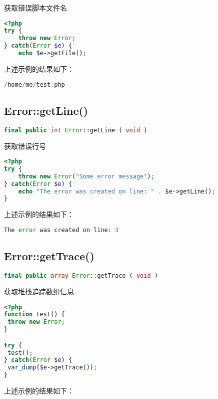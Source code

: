 获取错误脚本文件名




\begin{lstlisting}[language=PHP]
<?php
try {
    throw new Error;
} catch(Error $e) {
    echo $e->getFile();
\end{lstlisting}

上述示例的结果如下：

\begin{lstlisting}[language=PHP]
/home/me/test.php
\end{lstlisting}


\subsection{Error::getLine()}

\begin{lstlisting}[language=PHP]
final public int Error::getLine ( void )
\end{lstlisting}

获取错误行号



\begin{lstlisting}[language=PHP]
<?php
try {
    throw new Error("Some error message");
} catch(Error $e) {
    echo "The error was created on line: " . $e->getLine();
}
\end{lstlisting}

上述示例的结果如下：

\begin{lstlisting}[language=PHP]
The error was created on line: 3
\end{lstlisting}


\subsection{Error::getTrace()}

\begin{lstlisting}[language=PHP]
final public array Error::getTrace ( void )
\end{lstlisting}

获取堆栈追踪数组信息



\begin{lstlisting}[language=PHP]
<?php
function test() {
 throw new Error;
}

try {
 test();
} catch(Error $e) {
 var_dump($e->getTrace());
}
\end{lstlisting}

上述示例的结果如下：

